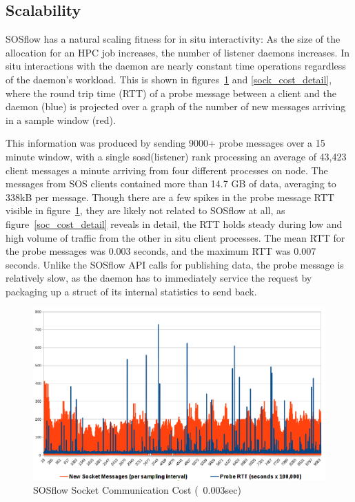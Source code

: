 \subsection{Scalability}

SOSflow has a natural scaling fitness for in situ interactivity: As
the size of the allocation for an HPC job increases, the number of
listener daemons increases. In situ interactions with the daemon
are nearly constant time operations regardless of the daemon's workload.
This is shown in figures~\ref{sock_cost} and \ref{sock_cost_detail}, where
the round trip time (RTT) of a probe message between a client and
the daemon (blue) is projected over a graph of the number of new messages
arriving in a sample window (red).

This information was produced by sending 9000+ probe messages over a
15 minute window, with a single sosd(listener) rank processing an
average of 43,423 client messages a minute arriving from four
different processes on node.  The messages from SOS clients contained
more than 14.7 GB of data, averaging to 338kB per message. Though
there are a few spikes in the probe message RTT visible in
figure~\ref{sock_cost}, they are likely not related to SOSflow at all,
as figure~\ref{soc_cost_detail} reveals in detail, the RTT holds
steady during low and high volume of traffic from the other in situ
client processes.  The mean RTT for the probe messages was 0.003
seconds, and the maximum RTT was 0.007 seconds.  Unlike the SOSflow
API calls for publishing data, the probe message is relatively slow,
as the daemon has to immediately service the request by packaging up a
struct of its internal statistics to send back.

\begin{figure}[!t]
\centering
\includegraphics[width=5in]{images/icebox_api_cost_when_slam.png}
\caption{SOSflow Socket Communication Cost (~0.003sec)}
\label{sock_cost}
\end{figure}


